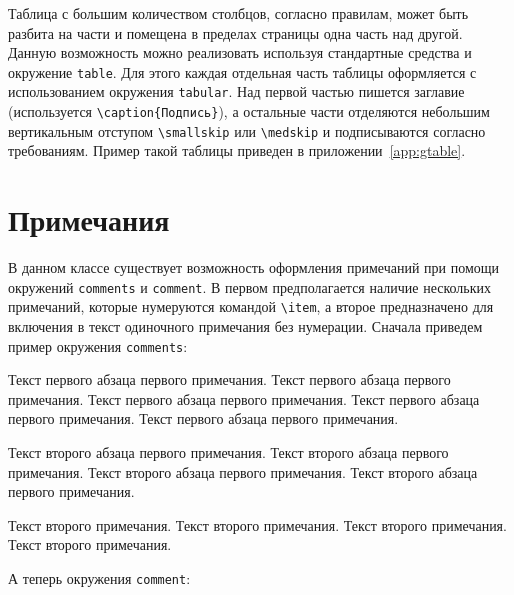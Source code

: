 Таблица с большим количеством столбцов, согласно правилам, может быть разбита на
части  и помещена в пределах страницы одна часть над другой. Данную возможность
можно реализовать используя стандартные средства \LaTeXe{}  и окружение
\verb|table|. Для этого каждая отдельная часть таблицы оформляется с
использованием окружения \verb|tabular|. Над первой частью пишется заглавие
(используется \verb|\caption{Подпись}|), а остальные части отделяются небольшим
вертикальным отступом \verb|\smallskip| или \verb|\medskip| и подписываются
согласно требованиям. Пример такой таблицы приведен в
приложении~\ref{app:gtable}.

\section{Примечания}

В данном классе существует возможность оформления примечаний при помощи
окружений \verb|comments| и \verb|comment|. В первом предполагается наличие
нескольких примечаний, которые нумеруются командой \verb|\item|, а второе
предназначено для включения в текст одиночного примечания без нумерации. Сначала
приведем пример окружения \verb|comments|:

\begin{comments}
\item Текст первого абзаца первого примечания. Текст первого абзаца первого
примечания. Текст первого абзаца первого примечания. Текст первого абзаца
первого примечания. Текст первого абзаца первого примечания.

Текст второго абзаца первого примечания. Текст второго абзаца первого
примечания. Текст второго абзаца первого примечания. Текст второго абзаца
первого примечания.

\item Текст второго примечания. Текст второго примечания. Текст второго
примечания. Текст второго примечания.
\end{comments}

А теперь окружения \verb|comment|:


